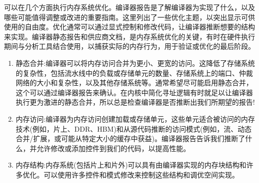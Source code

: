 可以在几个方面执行内存系统优化。编译器报告是了解编译器为实现了什么，以及哪些可能值得调整或改进的重要指南。这里列出了一些优化主题，以突出显示可供使用的自由度。优化通常可以通过显式控制和修改代码，让编译器推断想要的结构来实现。编译器静态报告和供应商文档，是内存系统优化的关键，有时在硬件执行期间与分析工具结合使用，以捕获实际的内存行为，用于验证或优化的最后阶段。\par

\begin{enumerate}
	\item 静态合并:编译器可以将内存访问合并为更小、更宽的访问。这降低了存储系统的复杂性，包括流水线中的负载或存储单元的数量、存储系统上的端口、仲裁网络的大小和复杂性，以及其他存储系统等。通常希望尽可能启用静态合并，这个可以通过编译器报告来确认。在内核中简化寻址逻辑有时就足以让编译器执行更为激进的静态合并，所以总是检查编译器是否推断出我们所期望的报告!
	\item 内存访问:编译器为内存访问创建加载或存储单元，这些单元适合被访问的内存技术(例如，片上、DDR、HBM)和从源代码推断的访问模式(例如，流、动态合并/扩展，或可能从特定大小的缓存中获益)。编译器报告告诉我们推断了什么，并允许修改或添加控件到我们的代码，以提高性能。
	\item 内存结构:内存系统(包括片上和片外)可以具有由编译器实现的内存块结构和许多优化。可以使用许多控件和模式修改来控制这些结构和调优空间实现。
\end{enumerate}
















